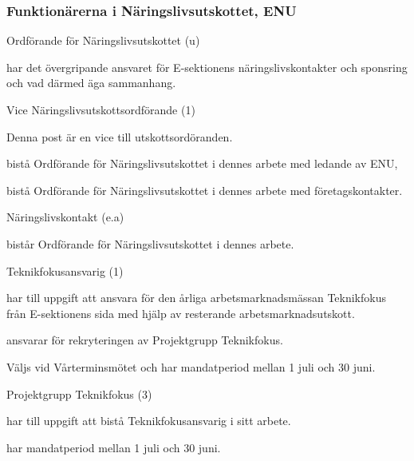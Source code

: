 \documentclass[10pt]{article}
\begin{document}
\subsubsection{Funktionärerna i Näringslivsutskottet, ENU}

\begin{emptylist}
    \item Ordförande för Näringslivsutskottet (u)
        \begin{dashlist}
            \item har det övergripande ansvaret för E-sektionens
                näringslivskontakter och sponsring och vad därmed äga
                sammanhang.
        \end{dashlist}
    \item Vice Näringslivsutskottsordförande (1)
        \begin{dashlist}
            \item Denna post är en vice till utskottsordöranden.
            \item bistå Ordförande för Näringslivsutskottet i dennes arbete med ledande av ENU,
            \item bistå Ordförande för Näringslivsutskottet i dennes arbete med företagskontakter.
        \end{dashlist}
    \item Näringslivskontakt (e.a)
        \begin{dashlist}
            \item bistår Ordförande för Näringslivsutskottet i dennes arbete.
        \end{dashlist}
    \item Teknikfokusansvarig (1)
    		\begin{dashlist}
    			\item har till uppgift att ansvara för den årliga arbetsmarknadsmässan Teknikfokus från E-sektionens sida med hjälp av resterande arbetsmarknadsutskott.
    			\item ansvarar för rekryteringen av Projektgrupp Teknikfokus.
                \item Väljs vid Vårterminsmötet och har mandatperiod mellan 1 juli och 30 juni.
    		\end{dashlist}
    	\item Projektgrupp Teknikfokus (3)
    		\begin{dashlist}
    			\item har till uppgift att bistå Teknikfokusansvarig i sitt arbete.
    			\item har mandatperiod mellan 1 juli och 30 juni.

\end{dashlist}
\end{emptylist}
\end{document}
